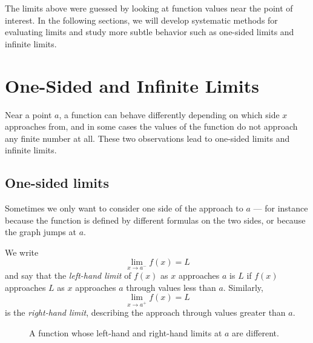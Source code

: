 The limits above were guessed by looking at function values near the point of interest. In the following sections, we will develop systematic methods for evaluating limits and study more subtle behavior such as one-sided limits and infinite limits.


\section{One-Sided and Infinite Limits}

Near a point \(a\), a function can behave differently depending on which side \(x\) approaches from, and in some cases the values of the function do not approach any finite number at all. These two observations lead to one-sided limits and infinite limits.

\subsection{One-sided limits}

Sometimes we only want to consider one side of the approach to \(a\) --- for instance because the function is defined by different formulas on the two sides, or because the graph jumps at \(a\).

\begin{definition}
We write
\[
\lim_{x \to a^{-}} f(x) = L
\]
and say that the \emph{left-hand limit} of \(f(x)\) as \(x\) approaches \(a\) is \(L\) if \(f(x)\) approaches \(L\) as \(x\) approaches \(a\) through values less than \(a\). Similarly,
\[
\lim_{x \to a^{+}} f(x) = L
\]
is the \emph{right-hand limit}, describing the approach through values greater than \(a\).
\end{definition}

\begin{figure}[H]
\centering
{}
\caption{A function whose left-hand and right-hand limits at \(a\) are different.}
\label{fig:one-sided-limits}
\end{figure}

